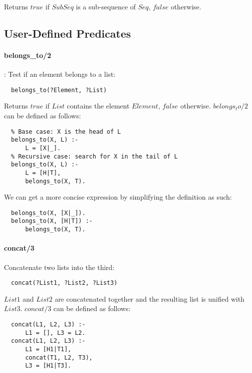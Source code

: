 \documentclass{article}
\begin{document}
\begin{multicols}{2}
  Returns $true$ if $SubSeq$ is a sub-sequence of $Seq$, $false$ otherwise.
  
  \subsection{User-Defined Predicates}

  \paragraph{belongs\_to/2}: Test if an element belongs to a list:
  
  \begin{lstlisting}
  belongs_to(?Element, ?List)
  \end{lstlisting} 
  
  Returns $true$ if $List$ contains the element $Element$, $false$ otherwise. $belongs_to/2$ can be defined as follows:

  \begin{lstlisting}
  % Base case: X is the head of L
  belongs_to(X, L) :-
      L = [X|_].
  % Recursive case: search for X in the tail of L
  belongs_to(X, L) :-
      L = [H|T],
      belongs_to(X, T).
  \end{lstlisting} 
  
  We can get a more concise expression by simplifying the definition as such:

  \begin{lstlisting}
  belongs_to(X, [X|_]).
  belongs_to(X, [H|T]) :-
      belongs_to(X, T).
  \end{lstlisting} 
  
  \paragraph{concat/3} Concatenate two lists into the third:
  
  \begin{lstlisting}
  concat(?List1, ?List2, ?List3)
  \end{lstlisting} 
  
  $List1$ and $List2$ are concatenated together and the resulting list is unified with $List3$. $concat/3$ can be defined as follows:

  \begin{lstlisting}
  concat(L1, L2, L3) :-
      L1 = [], L3 = L2.
  concat(L1, L2, L3) :- 
      L1 = [H1|T1],
      concat(T1, L2, T3),
      L3 = [H1|T3].
  \end{lstlisting} 
  

\end{multicols}
\end{document}
